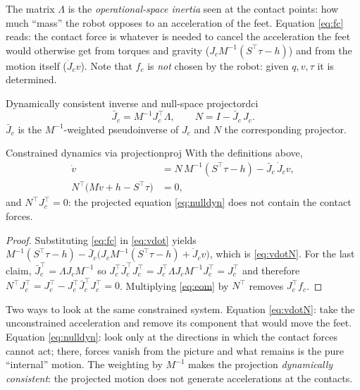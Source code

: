\documentclass[11pt,a4paper]{article}
\newcommand{\Jc}{J_c}
\newcommand{\Jb}{\bar{J}_c}
\begin{document}
\begin{intuition}
The matrix $\Lambda$ is the \emph{operational-space inertia} seen at the contact points:
how much ``mass'' the robot opposes to an acceleration of the feet. Equation \eqref{eq:fc}
reads: the contact force is whatever is needed to cancel the acceleration the feet would
otherwise get from torques and gravity ($\Jc M^{-1}(S^\top\tau-h)$) and from the motion
itself ($\dot J_c v$). Note that $f_c$ is \emph{not} chosen by the robot: given $q,v,\tau$
it is determined.
\end{intuition}

\begin{definition}{Dynamically consistent inverse and null-space projector}{dci}
\begin{equation}
  \Jb=M^{-1}\Jc^\top\Lambda,\qquad N=I-\Jb\,\Jc .
\end{equation}
$\Jb$ is the $M^{-1}$-weighted pseudoinverse of $\Jc$ and $N$ the corresponding projector.
\end{definition}

\begin{proposition}{Constrained dynamics via projection}{proj}
With the definitions above,
\begin{align}
  \dot v &= N\,M^{-1}(S^\top\tau-h)-\Jb\,\dot J_c v, \label{eq:vdotN}\\
  N^{\top}\big(M\dot v+h-S^\top\tau\big)&=0 , \label{eq:nulldyn}
\end{align}
and $N^\top\Jc^\top=0$: the projected equation \eqref{eq:nulldyn} does not contain the
contact forces.
\end{proposition}
\begin{proof}
Substituting \eqref{eq:fc} in \eqref{eq:vdot} yields $M^{-1}(S^\top\tau-h)-\Jb\big(\Jc M^{-1}(S^\top\tau-h)+\dot J_c v\big)$,
which is \eqref{eq:vdotN}. For the last claim, $\Jb^\top=\Lambda\Jc M^{-1}$ so
$\Jc^\top\Jb^\top\Jc^\top=\Jc^\top\Lambda\Jc M^{-1}\Jc^\top=\Jc^\top$ and therefore
$N^\top\Jc^\top=\Jc^\top-\Jc^\top\Jb^\top\Jc^\top=0$. Multiplying \eqref{eq:eom} by $N^\top$
removes $\Jc^\top f_c$.
\end{proof}

\begin{intuition}
Two ways to look at the same constrained system. Equation \eqref{eq:vdotN}: take the
unconstrained acceleration and remove its component that would move the feet. Equation
\eqref{eq:nulldyn}: look only at the directions in which the contact forces cannot act;
there, forces vanish from the picture and what remains is the pure ``internal'' motion.
The weighting by $M^{-1}$ makes the projection \emph{dynamically consistent}: the
projected motion does not generate accelerations at the contacts.
\end{intuition}
\end{document}
